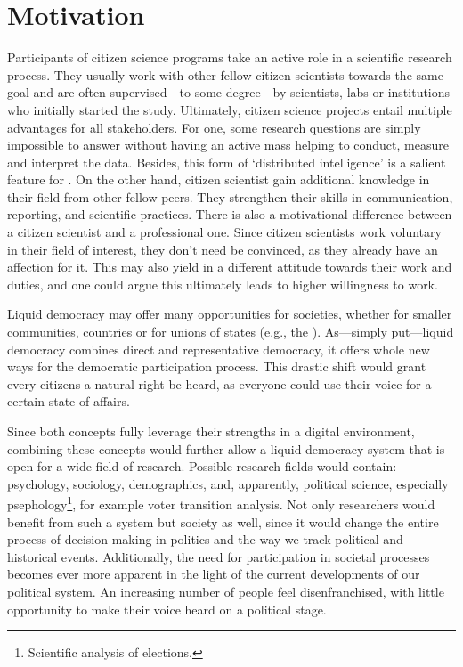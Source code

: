 \section{Motivation}
\label{sec:Motivation}

Participants of citizen science programs take an active role in a scientific research process. They usually work with other fellow citizen scientists towards the same goal and are often supervised---to some degree---by scientists, labs or institutions who initially started the study. Ultimately, citizen science projects entail multiple advantages for all stakeholders. For one, some research questions are simply impossible to answer without having an active mass helping to conduct, measure and interpret the data. Besides, this form of ‘distributed intelligence’ is a salient feature for . On the other hand, citizen scientist gain additional knowledge in their field from other fellow peers. They strengthen their skills in communication, reporting, and scientific practices. There is also a motivational difference between a citizen scientist and a professional one. Since citizen scientists work voluntary in their field of interest, they don’t need be convinced, as they already have an affection for it. This may also yield in a different attitude towards their work and duties, and one could argue this ultimately leads to higher willingness to work.

Liquid democracy may offer many opportunities for societies, whether for smaller communities, countries or for unions of states (e.g., the ). As---simply put---liquid democracy combines direct and representative democracy, it offers whole new ways for the democratic participation process. This drastic shift would grant every citizens a natural right be heard, as everyone could use their voice for a certain state of affairs.

Since both concepts fully leverage their strengths in a digital environment, combining these concepts would further allow a liquid democracy system that is open for a wide field of research. Possible research fields would contain: psychology, sociology, demographics, and, apparently, political science, especially psephology\footnote{Scientific analysis of elections.}, for example voter transition analysis. Not only researchers would benefit from such a system but society as well, since it would change the entire process of decision-making in politics and the way we track political and historical events. Additionally, the need for participation in societal processes becomes ever more apparent in the light of the current developments of our political system. An increasing number of people feel disenfranchised, with little opportunity to make their voice heard on a political stage.


